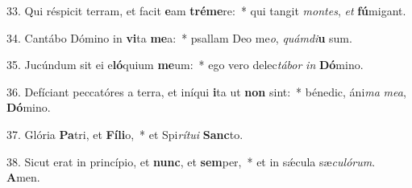 33. Qui réspicit terram, et facit \textbf{e}am \textbf{tré}\textbf{me}re:~*  qui tangit \textit{mon}\textit{tes}, \textit{et} \textbf{fú}migant.\

34. Cantábo Dómino in \textbf{vi}ta \textbf{me}a:~*  psallam Deo me\textit{o}, \textit{quám}\textit{di}\textbf{u} sum.\

35. Jucúndum sit ei e\textbf{ló}quium \textbf{me}um:~*  ego vero delec\textit{tá}\textit{bor} \textit{in} \textbf{Dó}mino.\

36. Defíciant peccatóres a terra, et iníqui \textbf{i}ta ut \textbf{non} sint:~*  bénedic, áni\textit{ma} \textit{me}\textit{a}, \textbf{Dó}mino.\

37. Glória \textbf{Pa}tri, et \textbf{Fí}\textbf{li}o,~*  et Spi\textit{rí}\textit{tu}\textit{i} \textbf{Sanc}to.\

38. Sicut erat in princípio, et \textbf{nunc}, et \textbf{sem}per,~*  et in sǽcula sæ\textit{cu}\textit{ló}\textit{rum}. \textbf{A}men.\

